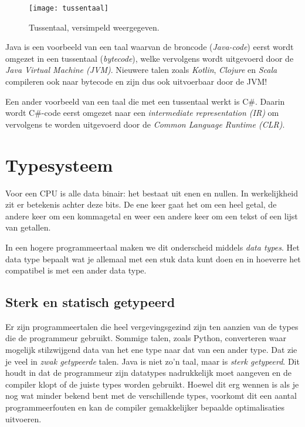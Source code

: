 \begin{figure}[H]
    \centering
    \texttt{[image: tussentaal]}
    \caption{Tussentaal, versimpeld weergegeven.}
    \label{fig:tussentaal}
\end{figure}

Java is een voorbeeld van een taal waarvan 
de broncode (\textit{Java-code}) eerst wordt 
omgezet in een tussentaal (\textit{bytecode}),
welke vervolgens wordt uitgevoerd door de \textit{Java Virtual Machine (JVM)}.
Nieuwere talen zoals \textit{Kotlin}, \textit{Clojure} en \textit{Scala} 
compileren ook naar bytecode en zijn dus ook uitvoerbaar door de JVM!

Een ander voorbeeld van een taal die met een tussentaal werkt is C\#.
Daarin wordt C\#-code eerst omgezet naar een 
\textit{intermediate representation (IR)} om vervolgens te worden uitgevoerd
door de \textit{Common Language Runtime (CLR)}.

\section{Typesysteem}
Voor een CPU is alle data binair: het bestaat uit enen en nullen.
In werkelijkheid zit er betekenis achter deze bits. 
De ene keer gaat het om een heel getal, de andere keer om een kommagetal
en weer een andere keer om een tekst of een lijst van getallen.

In een hogere programmeertaal maken we dit onderscheid middels \textit{data types}.
Het data type bepaalt wat je allemaal met een stuk data kunt doen en in hoeverre het 
compatibel is met een ander data type.

\subsection{Sterk en statisch getypeerd}
Er zijn programmeertalen die heel vergevingsgezind zijn ten aanzien van de types
die de programmeur gebruikt. Sommige talen, zoals Python, converteren waar mogelijk 
stilzwijgend data van het ene type naar dat van een ander type. Dat zie je veel 
in \textit{zwak getypeerde} talen.
Java is niet zo'n taal, maar is \textit{sterk getypeerd}. 
Dit houdt in dat de programmeur zijn datatypes nadrukkelijk moet aangeven
en de compiler klopt of de juiste types worden gebruikt. Hoewel dit erg 
wennen is als je nog wat minder bekend bent met de verschillende types,
voorkomt dit een aantal programmeerfouten en kan de compiler gemakkelijker
bepaalde optimalisaties uitvoeren.

